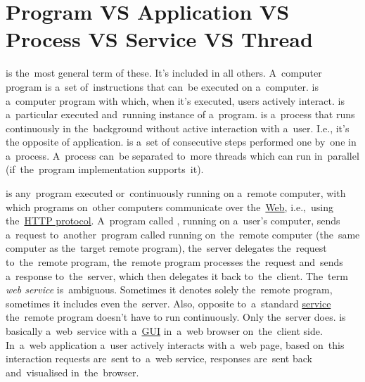 \section*{\fontsize{17}{17} \selectfont Program VS Application VS Process VS Service VS Thread}
\label{applicationprocessprogramservicethread}
\begin{itemize}
     is the~most general term of these.
            It's included in all others.
            A~computer program is a~set of~instructions that can~be executed on a~computer.
     is a~computer program with which, when it's executed, users actively interact.
     is a~particular executed and~running instance of a~program.
     is a~process that runs continuously in the~background without active interaction with a~user.
            I.e., it's the opposite of application.
     is a~set of consecutive steps performed one by~one in a~process.
            A~process can~be separated to~more threads which can run in~parallel (if~the~program implementation supports~it).
\end{itemize}

\label{webserviceapplication}
\begin{itemize}
     is any~program executed or~continuously running on a~remote computer, with which programs on~other computers communicate over the~\hyperref[internetweb]{Web}, i.e.,~using the~\hyperref[http]{HTTP protocol}.
            A~program called \hyperref[clientserverarchitecture]{}, running on a~user's computer, sends a~request to~another~program called \hyperref[clientserverarchitecture]{} running on~the~remote computer (the~same computer as the~target remote program), the~server delegates the~request to~the~remote program, the~remote program processes the~request and~sends a~response to~the~server, which then delegates it back to~the~client.
            \warningnonl The~term \textit{web service} is~ambiguous.
            Sometimes it denotes solely the~remote program, sometimes it includes even the~server.
            Also, opposite to~a~standard \hyperref[applicationprocessprogramservicethread]{service} the~remote program doesn't have to run continuously.
            Only the~server does.
     is basically a~web~service with a~\hyperref[shellcligui]{GUI} in~a~web browser on~the~client side.
            In~a~web application a~user actively interacts with a~web page, based on~this interaction requests are~sent to~a~web service, responses are~sent back and~visualised in~the~browser.
\end{itemize}
\newpage
